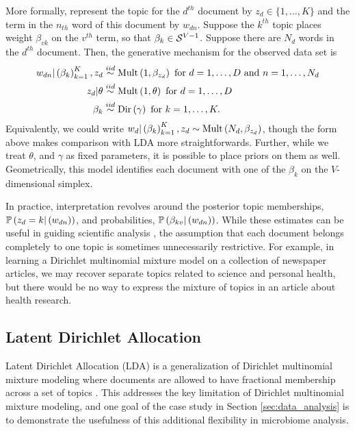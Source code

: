 \documentclass[oupdraft]{bio}
\begin{document}
More formally, represent the topic for the $d^{th}$ document by $z_{d} \in \{1,
\dots, K\}$ and the term in the $n_{th}$ word of this document by $w_{dn}$.
Suppose the $k^{th}$ topic places weight $\beta_{vk}$ on the $v^{th}$ term, so
that $\beta_{k} \in \mathcal{S}^{V - 1}$. Suppose there are $N_{d}$ words in the
$d^{th}$ document. Then, the generative mechanism for the observed data set is
\begin{align*}
  w_{dn} \vert \left(\beta_{k}\right)_{k = 1}^{K}, z_{d} &\overset{iid}{\sim}\textnormal{Mult}\left(1, \beta_{z_{d}}\right) \text{ for } d = 1, \dots, D \text{ and } n = 1, \dots, N_{d} \\
  z_{d} \vert \theta &\overset{iid}{\sim} \textnormal{Mult}\left(1, \theta\right) \text{ for } d = 1, \dots, D \\
  \beta_{k} &\overset{iid}{\sim} \textnormal{Dir}\left(\gamma\right) \text{ for } k = 1, \dots, K.
\end{align*}
Equivalently, we could write $w_{d} \vert \left(\beta_{k}\right)_{k = 1}^{K},
z_{d} \sim \textnormal{Mult}\left(N_{d}, \beta_{z_{d}}\right)$, though the form above makes
comparison with LDA more straightforwards. Further, while we treat $\theta$, and
$\gamma$ as fixed parameters, it is possible to place priors on them as well.
Geometrically, this model identifies each document with one of the $\beta_{k}$ on
the $V$-dimensional simplex.

In practice, interpretation revolves around the posterior topic memberships,
$\mathbb{P}\left({z_{d} = k \vert \left(w_{dn}\right)}\right)$, and probabilities,
$\mathbb{P}\left({\beta_{kv}\vert \left(w_{dn}\right)}\right)$. While these
estimates can be useful in guiding scientific analysis \citep{nigam2000text,
  holmes2012dirichlet}, the assumption that each document belongs completely to
one topic is sometimes unnecessarily restrictive. For example, in learning a
Dirichlet multinomial mixture model on a collection of newspaper articles, we
may recover separate topics related to science and personal health, but there
would be no way to express the mixture of topics in an article about health
research.

\subsection{Latent Dirichlet Allocation}

Latent Dirichlet Allocation (LDA) is a generalization of Dirichlet multinomial
mixture modeling where documents are allowed to have fractional membership
across a set of topics \citep{blei2003latent}. This addresses the key limitation
of Dirichlet multinomial mixture modeling, and one goal of the case study in
Section \ref{sec:data_analysis} is to demonstrate the usefulness of this
additional flexibility in microbiome analysis.
\end{document}
